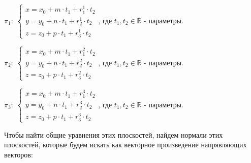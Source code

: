 \begin{center}
	$\pi_1: \; \begin{cases}
		x = x_0 + m \cdot t_1 + r_1^1 \cdot t_2 \\
		y = y_0 + n \cdot t_1 + r_2^1 \cdot t_2 \\
		z = z_0 + p \cdot t_1 + r_3^1 \cdot t_2
	\end{cases}$, где $t_1, t_2 \in \mathbb{R}$ - параметры. 

	\vspace{0.2cm}
	$\pi_2: \; \begin{cases}
		x = x_0 + m \cdot t_1 + r_1^2 \cdot t_2 \\
		y = y_0 + n \cdot t_1 + r_2^2 \cdot t_2 \\
		z = z_0 + p \cdot t_1 + r_3^2 \cdot t_2
	\end{cases}$, где $t_1, t_2 \in \mathbb{R}$ - параметры. 

	\vspace{0.2cm}
	$\pi_3: \; \begin{cases}
		x = x_0 + m \cdot t_1 + r_1^3 \cdot t_2 \\
		y = y_0 + n \cdot t_1 + r_2^3 \cdot t_2 \\
		z = z_0 + p \cdot t_1 + r_3^3 \cdot t_2
	\end{cases}$, где $t_1, t_2 \in \mathbb{R}$ - параметры. 
\end{center}
\newpage
Чтобы найти общие уравнения этих плоскостей, найдем нормали этих плоскостей, которые будем искать как векторное произведение напрявляющих векторов:

